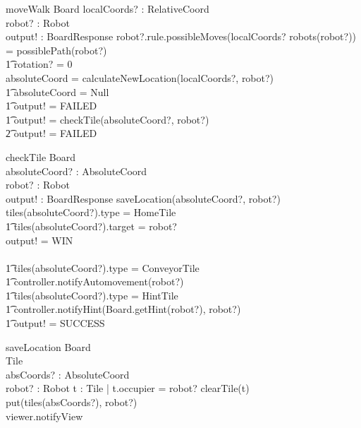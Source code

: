 \documentclass[a4paper,11pt]{article}
\begin{document}
\begin{schema}{moveWalk}
\Delta Board
localCoords? : RelativeCoord \\
robot? : Robot \\
output! : BoardResponse
\where
\IF robot?.rule.possibleMoves(localCoords? \cross robots(robot?)) = possiblePath(robot?) \\ \t1
rotation? = 0 \\
\THEN absoluteCoord = calculateNewLocation(localCoords?, robot?)\\ \t1
\IF absoluteCoord = Null \\ \t1
\THEN output! = FAILED \\ \t1
\ELSE output! = checkTile(absoluteCoord?, robot?)\\ \t2
\ELSE output! = FAILED
\end{schema}

\begin{schema}{checkTile}
\Delta Board \\
absoluteCoord? : AbsoluteCoord \\
robot? : Robot \\
output! : BoardResponse
\where
saveLocation(absoluteCoord?, robot?) \\ 
\IF tiles(absoluteCoord?).type = HomeTile \\ \t1
tiles(absoluteCoord?).target = robot? \\ 
\THEN output! = WIN \\ \
\ELSE  \\ \t1
\IF tiles(absoluteCoord?).type = ConveyorTile \\ \t1
\THEN controller.notifyAutomovement(robot?) \\ \t1
\IF tiles(absoluteCoord?).type = HintTile \\ \t1
\THEN controller.notifyHint(Board.getHint(robot?), robot?) \\ \t1
output! = SUCCESS
\end{schema}

\begin{schema}{saveLocation}
\Xi Board \\
\Delta Tile \\
absCoords? : AbsoluteCoord \\
robot? : Robot
\where
\exists t : Tile | t.occupier = robot? \implies clearTile(t)\\
put(tiles(absCoords?), robot?) \\
viewer.notifyView
\end{schema}
\end{document}

